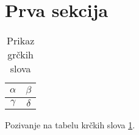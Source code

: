 \documentclass[11pt]{article}
\begin{document}
	\section{Prva sekcija}

	\begin{table}[hpb]
		\centering
		\begin{tabular}{|c|c|}
			\hline
			$ \alpha $ & $ \beta $ \\ \hline
			$ \gamma $ & $ \delta $ \\ \hline
		\end{tabular}
		\caption{Prikaz gr\v ckih slova}
		\label{grc}
	\end{table}

	Pozivanje na tabelu kr\v ckih slova \ref{grc}.
\end{document}
